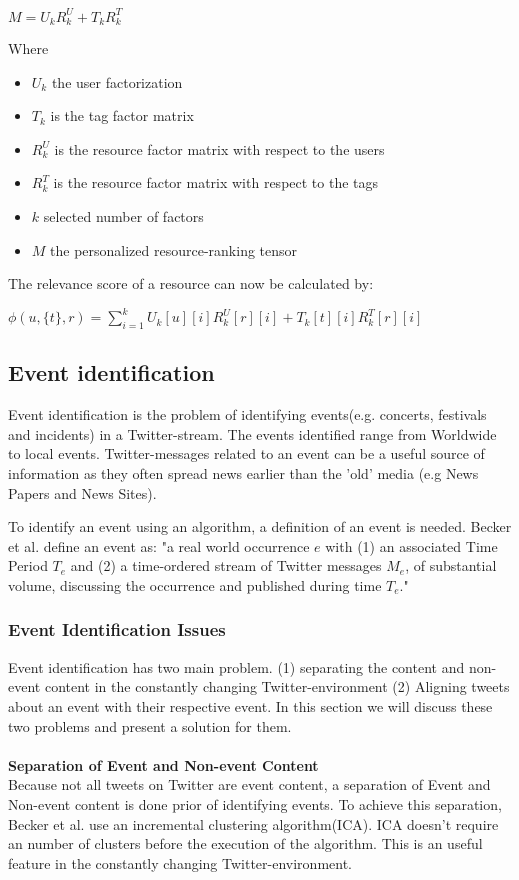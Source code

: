 \documentclass{article}
\begin{document}
\begin{enumerate}
$M = U_k R_k^U + T_k R_k^T$

Where 
\begin{itemize}
 \item $U_k$ the user factorization
 \item $T_k$ is the tag factor matrix
 \item $R_k^U$ is the resource factor matrix with respect to the users
 \item $R_k^T$ is the resource factor matrix with respect to the tags
 \item $k$ selected number of factors
 \item $M$ the personalized resource-ranking tensor
\end{itemize}

The relevance score of a resource can now be calculated by:

$\phi (u, \{t\}, r) = \sum_{i=1}^k U_k[u][i]R_k^U[r][i] + T_k[t][i]R_k^T[r][i]$	
\end{enumerate}


\subsection{Event identification}

Event identification is the problem of identifying events(e.g. concerts, festivals and incidents) in a Twitter-stream. The events identified range from Worldwide to local events. Twitter-messages related to an event can be a useful source of information as they often spread news earlier than the 'old' media (e.g News Papers and News Sites).

To identify an event using an algorithm, a definition of an event is needed. Becker et al.  define an event as: "a real world occurrence $e$ with (1) an associated Time Period $T_e$ and (2) a time-ordered stream of Twitter messages $M_e$, of substantial volume, discussing the occurrence and published during time $T_e$." \cite{eventident} 

\subsubsection{Event Identification Issues}
Event identification has two main problem. (1) separating the content and non-event content in the constantly changing 
Twitter-environment (2) Aligning tweets about an event with their respective event. In this section we will discuss these two problems and present a solution for them.
\\\\ 
\textbf{Separation of Event and Non-event Content}\\
Because not all tweets on Twitter are event content, a separation of Event and Non-event content is done prior of identifying events. To achieve this separation, Becker et al.  use an incremental clustering algorithm(ICA). ICA doesn't require an number of clusters before the execution of the algorithm. This is an useful feature in the constantly changing Twitter-environment. \cite{eventident} 
\end{document}
